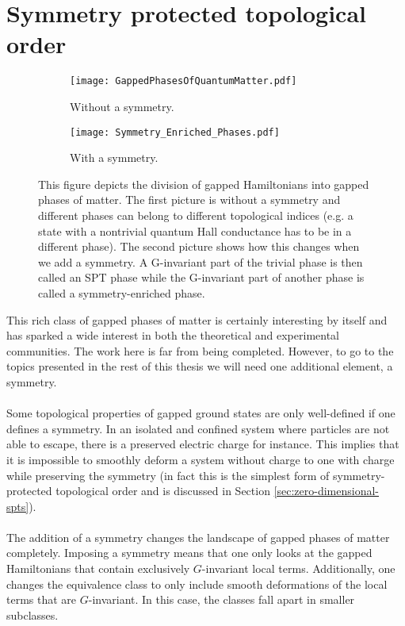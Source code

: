 \section{Symmetry protected topological order}
\begin{figure}
	\begin{subfigure}[b]{0.45\textwidth}
		\centering
		\texttt{[image: GappedPhasesOfQuantumMatter.pdf]}
		\caption{Without a symmetry.}
	\end{subfigure}
	\hfil
	\begin{subfigure}[b]{0.45\textwidth}
		\centering
		\texttt{[image: Symmetry\_Enriched\_Phases.pdf]}
		\caption{With a symmetry.}
	\end{subfigure}
	\caption{This figure depicts the division of gapped Hamiltonians into gapped phases of matter. The first picture is without a symmetry and different phases can belong to different topological indices (e.g. a state with a nontrivial quantum Hall conductance has to be in a different phase). The second picture shows how this changes when we add a symmetry. A G-invariant part of the trivial phase is then called an SPT phase while the G-invariant part of another phase is called a symmetry-enriched phase.}
	\label{fig:SymmetryEnrichedIntroduction}
\end{figure}
This rich class of gapped phases of matter is certainly interesting by itself and has sparked a wide interest in both the theoretical and experimental communities. The work here is far from being completed. However, to go to the topics presented in the rest of this thesis we will need one additional element, a symmetry.
\\\\
Some topological properties of gapped ground states are only well-defined if one defines a symmetry. In an isolated and confined system where particles are not able to escape, there is a preserved electric charge for instance. This implies that it is impossible to smoothly deform a system without charge to one with charge while preserving the symmetry (in fact this is the simplest form of symmetry-protected topological order and is discussed in Section \ref{sec:zero-dimensional-spts}).
\\\\
The addition of a symmetry changes the landscape of gapped phases of matter completely. Imposing a symmetry means that one only looks at the gapped Hamiltonians that contain exclusively $G$-invariant local terms. Additionally, one changes the equivalence class to only include smooth deformations of the local terms that are $G$-invariant. In this case, the classes fall apart in smaller subclasses.
